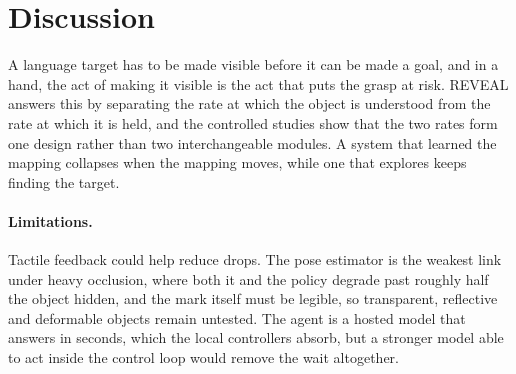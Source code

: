 \section{Discussion}

A language target has to be made visible before it can be made a goal, and in a hand, the act of making it visible is the act that puts the grasp at risk. REVEAL answers this by separating the rate at which the object is understood from the rate at which it is held, and the controlled studies show that the two rates form one design rather than two interchangeable modules. A system that learned the mapping collapses when the mapping moves, while one that explores keeps finding the target.

\paragraph{Limitations.}
Tactile feedback could help reduce drops. The pose estimator is the weakest link under heavy occlusion, where both it and the policy degrade past roughly half the object hidden, and the mark itself must be legible, so transparent, reflective and deformable objects remain untested. The agent is a hosted model that answers in seconds, which the local controllers absorb, but a stronger model able to act inside the control loop would remove the wait altogether.
